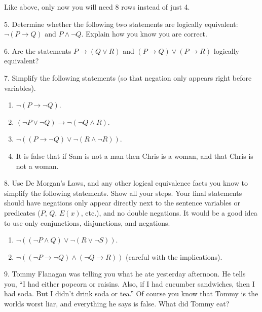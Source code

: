 \documentclass[10pt,]{book}
\theoremstyle{plain}
\theoremstyle{definition}
\numberwithin{equation}{chapter}
\def\imp{\rightarrow}
\begin{document}
\begin{exerciselist}
          Like above, only now you will need 8 rows instead of just 4.
\item[5.]\hypertarget{exercise-230}{}
          Determine whether the following two statements are logically equivalent:  \(\neg(P \imp Q)\) and \(P \wedge \neg Q\). Explain how you know you are correct.
\par\smallskip
\item[6.]\hypertarget{exercise-231}{}
          Are the statements \(P \imp (Q\vee R)\) and \((P \imp Q) \vee (P \imp R)\) logically equivalent?
\par\smallskip
\item[7.]\hypertarget{exercise-232}{} Simplify the following statements (so that negation only appears right before variables). %
\leavevmode%
\begin{enumerate}[label=(\alph*)]
\item\hypertarget{li-644}{}\(\neg(P \imp \neg Q)\).%
\item\hypertarget{li-645}{}\((\neg P \vee \neg Q) \imp \neg (\neg Q \wedge R)\).%
\item\hypertarget{li-646}{}\(\neg((P \imp \neg Q) \vee \neg (R \wedge \neg R))\).%
\item\hypertarget{li-647}{} It is false that if Sam is not a man then Chris is a woman, and that Chris is not a woman. %
\end{enumerate}
\par\smallskip
\item[8.]\hypertarget{exercise-233}{}
      Use De Morgan's Laws, and any other logical equivalence facts you know to simplify the following statements. Show all your steps. Your final statements should have negations only appear directly next to the sentence variables or predicates (\(P\), \(Q\), \(E(x)\), etc.), and no double negations. It would be a good idea to use only conjunctions, disjunctions, and negations.
\leavevmode%
\begin{enumerate}[label=(\alph*)]
\item\hypertarget{li-652}{}\(\neg((\neg P \wedge Q) \vee \neg(R \vee \neg S))\).

\item\hypertarget{li-653}{}\(\neg((\neg P \imp \neg Q) \wedge (\neg Q \imp R))\) (careful with the implications).

\end{enumerate}
\par\smallskip
\item[9.]\hypertarget{exercise-234}{}
      Tommy Flanagan was telling you what he ate yesterday afternoon. He tells you, ``I had either popcorn or raisins. Also, if I had cucumber sandwiches, then I had soda. But I didn't drink soda or tea.'' Of course you know that Tommy is the worlds worst liar, and everything he says is false. What did Tommy eat?
\par


\end{exerciselist}
\end{document}
